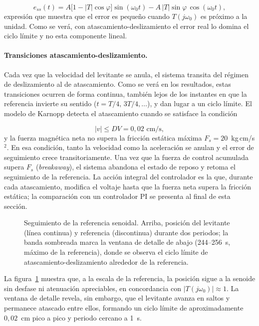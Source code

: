\begin{equation}
  e_{ss}(t) = A\bigl[1 - |T|\cos\varphi\bigr]\sin(\omega_0 t)
              - A\,|T|\sin\varphi\,\cos(\omega_0 t) ,
  \label{eq:ess_senoidal}
\end{equation}
expresión que muestra que el error es pequeño cuando $T(j\omega_0)$ es próximo a la unidad. Como se verá, con atascamiento-deslizamiento el error real lo domina el ciclo límite y no esta componente lineal.

\paragraph{Transiciones atascamiento-deslizamiento.}
Cada vez que la velocidad del levitante se anula, el sistema transita del régimen de deslizamiento al de atascamiento. Como se verá en los resultados, estas transiciones ocurren de forma continua, también lejos de los instantes en que la referencia invierte su sentido ($t = T/4,\,3T/4,\ldots$), y dan lugar a un ciclo límite.
El modelo de Karnopp detecta el atascamiento cuando se satisface la condición

\begin{equation}
  |v| \leq DV = 0{,}02 \text{ cm/s} ,
  \label{eq:banda_karnopp}
\end{equation}
y la fuerza magnética neta no supera la fricción estática máxima $F_s = 20$~kg\,cm/s$^2$.
En esa condición, tanto la velocidad como la aceleración se anulan y el error de seguimiento
crece transitoriamente.
Una vez que la fuerza de control acumulada supera $F_s$ (\emph{breakaway}), el sistema
abandona el estado de reposo y retoma el seguimiento de la referencia.
La acción integral del controlador es la que, durante cada atascamiento, modifica el voltaje hasta que la fuerza neta supera la fricción estática; la comparación con un controlador PI se presenta al final de esta sección.

\begin{figure}[ht]
    \centering
    
    \caption[Seguimiento senoidal: posición]{Seguimiento de la referencia senoidal. Arriba, posición del levitante (línea continua) y referencia (discontinua) durante dos periodos; la banda sombreada marca la ventana de detalle de abajo (244--256~s, máximo de la referencia), donde se observa el ciclo límite de atascamiento-deslizamiento alrededor de la referencia.}
    \label{fig:sen_pos}
\end{figure}

La figura~\ref{fig:sen_pos} muestra que, a la escala de la referencia, la posición sigue a la senoide sin desfase ni atenuación apreciables, en concordancia con $|T(j\omega_0)|\approx 1$. La ventana de detalle revela, sin embargo, que el levitante avanza en saltos y permanece atascado entre ellos, formando un ciclo límite de aproximadamente $0{,}02$~cm pico a pico y periodo cercano a 1~s.


